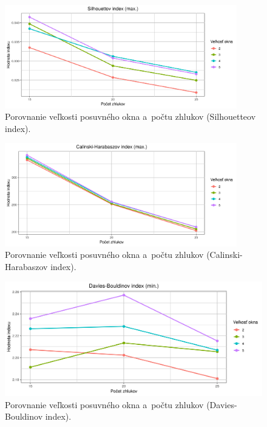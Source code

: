\documentclass[a4paper,twoside,slovak,12pt,appendix]{article}
\begin{document}
\begin{appendices}
\begin{figure}[htbp]
  \centering
  \includegraphics[width=0.90\textwidth]{cvi/dtw_basic_workdays_sparse/201904291110-Sil-dtw_basic_workdays_sparse.png}
  \caption{Porovnanie veľkosti posuvného okna a~počtu zhlukov (Silhouetteov index).}
\end{figure}
\begin{figure}[htbp]
  \centering
  \includegraphics[width=0.90\textwidth]{cvi/dtw_basic_workdays_sparse/201904291110-CH-dtw_basic_workdays_sparse.png}
  \caption{Porovnanie veľkosti posuvného okna a~počtu zhlukov (Calinski-Harabaszov index).}
\end{figure}
\begin{figure}[htbp]
  \centering
  \includegraphics[width=\textwidth]{cvi/dtw_basic_workdays_sparse/201904291110-DB-dtw_basic_workdays_sparse.png}
  \caption{Porovnanie veľkosti posuvného okna a~počtu zhlukov (Davies-Bouldinov index).}
\end{figure}

\end{appendices}
\end{document}
